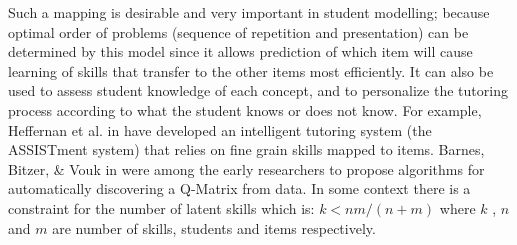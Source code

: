 Such a mapping is desirable and very important in student modelling; because optimal order of problems (sequence of repetition and presentation) can be determined by this model since it allows prediction of which item will cause learning of skills that transfer to the other items most efficiently. It can also be used to assess student knowledge of each concept, and to personalize the tutoring process according to what the student knows or does not know.  For example, Heffernan et al. in \citep{feng2009using} have developed an intelligent tutoring system (the ASSISTment system) that relies on fine grain skills mapped to items.  Barnes, Bitzer, \& Vouk in \citep{barnes2005experimental} were among the early researchers to propose algorithms for automatically discovering a Q-Matrix from data. In some context there is a constraint for the number of latent skills which is: $k<nm/(n+m)$ \protect\citep{lee1999learning} where $k$ , $n$ and $m$ are number of skills, students and items respectively.

